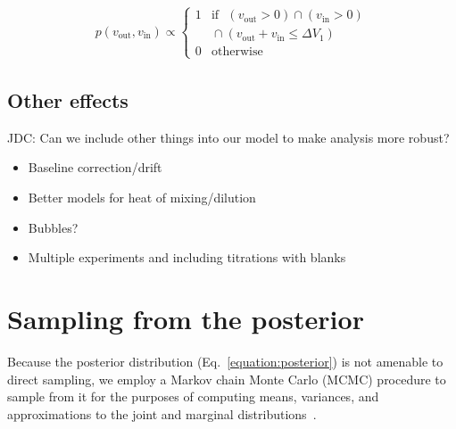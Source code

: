 \documentclass[aps,pre,twocolumn,nofootinbib,superscriptaddress,linenumbers]{revtex4-1}
\begin{document}
\begin{eqnarray}
p(v_\mathrm{out}, v_\mathrm{in}) \propto \begin{cases}
1 & \mathrm{if} \:\:\: (v_\mathrm{out} > 0) \cap (v_\mathrm{in} > 0) \\
   & \mbox{} \cap (v_\mathrm{out} + v_\mathrm{in} \leq \Delta V_1) \\
0 & \mathrm{otherwise}
\end{cases}
\end{eqnarray}


\subsection{Other effects}

\color{red}
JDC: Can we include other things into our model to make analysis more robust?
\begin{itemize}
  \item Baseline correction/drift
  \item Better models for heat of mixing/dilution
  \item Bubbles?
  \item Multiple experiments and including titrations with blanks
\end{itemize}
\color{black}

\section{Sampling from the posterior}
\label{section:sampling-from-posterior}

Because the posterior distribution (Eq.~\ref{equation:posterior}) is not amenable to direct sampling, we employ a Markov chain Monte Carlo (MCMC) procedure to sample from it for the purposes of computing means, variances, and approximations to the joint and marginal distributions~\cite{jun-s-liu:mcmc}.
\end{document}
